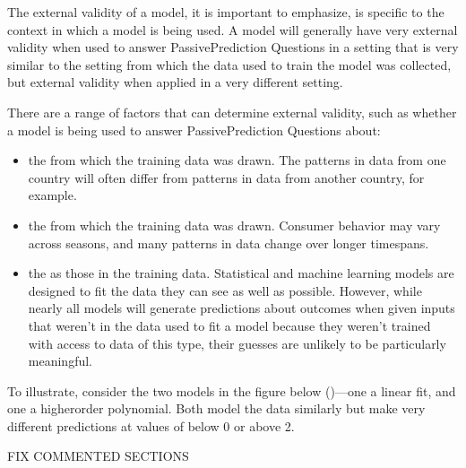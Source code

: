 \documentclass[letterpaper,10pt,english]{jupyterBook}
\begin{document}
\sphinxAtStartPar
The external validity of a model, it is important to emphasize, is specific to the context in which a model is being used. A model will generally have very  external validity when used to answer Passive\sphinxhyphen{}Prediction Questions in a setting that is very similar to the setting from which the data used to train the model was collected, but  external validity when applied in a very different setting.

\sphinxAtStartPar
There are a range of factors that can determine external validity, such as whether a model is being used to answer Passive\sphinxhyphen{}Prediction Questions about:
\begin{itemize}
\item {} 
\sphinxAtStartPar
the  from which the training data was drawn. The patterns in data from one country will often differ from patterns in data from another country, for example.

\item {} 
\sphinxAtStartPar
the  from which the training data was drawn. Consumer behavior may vary across seasons, and many patterns in data change over longer timespans.

\item {} 
\sphinxAtStartPar
the  as those in the training data. Statistical and machine learning models are designed to fit the data they can see as well as possible. However, while nearly all models will generate predictions about outcomes when given inputs that weren’t in the data used to fit a model because they weren’t trained with access to data of this type, their guesses are unlikely to be particularly meaningful.

\end{itemize}



\sphinxAtStartPar
To illustrate, consider the two models in the figure below ()—one a linear fit, and one a higher\sphinxhyphen{}order polynomial. Both model the data similarly  but make very different predictions at values of  below 0 or above 2.

\sphinxAtStartPar
FIX COMMENTED SECTIONS
\end{document}
